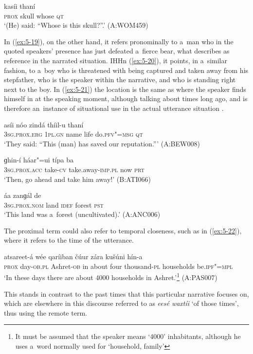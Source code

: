 \begin{exe}
\ex
\label{ex:5-18}
 kasíi thaní \\
\textsc{prox} skull whose \textsc{qt} \\
\glt `(He) said: ``Whose is this skull?''.' (A:WOM459)
\end{exe}
In (\ref{ex:5-19}), on the other hand, it refers pronominally to a~man who in the quoted speakers' presence has just defeated a~fierce bear, what \citet[222]{himmelmann1996} describes as reference in the narrated situation. IHHn (\ref{ex:5-20}), it points, in a~similar fashion, to a~boy who is threatened with being captured and taken away from his stepfather, who is the speaker within the narrative, and who is standing right next to the boy. In (\ref{ex:5-21}) the location is the same as where the speaker finds himself in at the speaking moment, although talking about times long ago, and is therefore an~instance of situational use in the actual utterance situation \citep[222]{himmelmann1996}.

\begin{exe}
\ex
\label{ex:5-19}
\gll [aníi] asíi nóo zindá thíil-u thaní \\
\textsc{3sg}.\textsc{prox.erg} \textsc{1pl.gn} name life do.\textsc{pfv"=msg} \textsc{qt} \\
\glt `They said: ``This (man) has saved our reputation.''' (A:BEW008)

\ex
\label{ex:5-20}
\gll [hanís] ɡhin-í háar"=ui típa ba \\
\textsc{3sg}.\textsc{prox.acc} take-\textsc{cv} take.away-\textsc{imp.pl} now \textsc{prt} \\
\glt `Then, go ahead and take him away!' (B:ATI066)

\ex
\label{ex:5-21}
 áa zanɡál de \\
\textsc{3sg}.\textsc{prox.nom} land \textsc{idef} forest \textsc{pst} \\
\glt `This land was a~forest (uncultivated).' (A:ANC006)
\end{exe}
The proximal term could also refer to temporal closeness, such as in (\ref{ex:5-22}), where it refers to the time of the utterance.

\begin{exe}
\ex
\label{ex:5-22}
 atsareet-á wée qaríiban čúur zára kušúni
hín-a \\
\textsc{prox} day-\textsc{ob.pl} Ashret-\textsc{ob} in about four thousand-\textsc{pl} households
be.\textsc{ipf"=mpl} \\
\glt `In these days there are about 4000 households in Ashret.'\footnote{It must be assumed that the speaker means `4000' inhabitants, although he uses a~word normally used for `household, family'} (A:PAS007)
\end{exe}
This stands in contrast to the past times that this particular narrative focuses on, which are elsewhere in this discourse referred to as \textit{eesé waxtíi} `of those times', thus using the remote term.

